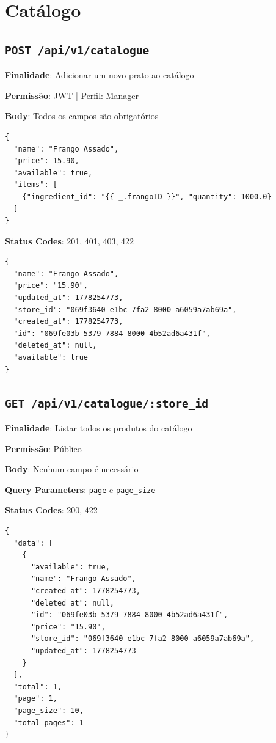 \section{Catálogo}

\subsection{\texttt{POST /api/v1/catalogue}}

\noindent\textbf{Finalidade}: Adicionar um novo prato ao catálogo

\noindent\textbf{Permissão}: JWT | Perfil: Manager

\noindent\textbf{Body}: Todos os campos são obrigatórios

\begin{verbatim}
{
  "name": "Frango Assado",
  "price": 15.90,
  "available": true,
  "items": [
    {"ingredient_id": "{{ _.frangoID }}", "quantity": 1000.0}
  ]
}
\end{verbatim}

\noindent\textbf{Status Codes}: 201, 401, 403, 422

\begin{tcolorbox}[colback=green!5, colframe=black, title=\textbf{201 Created}]
\begin{verbatim}
{
  "name": "Frango Assado",
  "price": "15.90",
  "updated_at": 1778254773,
  "store_id": "069f3640-e1bc-7fa2-8000-a6059a7ab69a",
  "created_at": 1778254773,
  "id": "069fe03b-5379-7884-8000-4b52ad6a431f",
  "deleted_at": null,
  "available": true
}
\end{verbatim}
\end{tcolorbox}

\subsection{\texttt{GET /api/v1/catalogue/:store\_id}}

\noindent\textbf{Finalidade}: Listar todos os produtos do catálogo

\noindent\textbf{Permissão}: Público

\noindent\textbf{Body}: Nenhum campo é necessário

\noindent\textbf{Query Parameters}: \texttt{page} e \texttt{page\_size}

\noindent\textbf{Status Codes}: 200, 422

\begin{tcolorbox}[colback=green!5, colframe=black, title=\textbf{200 OK}]
\begin{verbatim}
{
  "data": [
    {
      "available": true,
      "name": "Frango Assado",
      "created_at": 1778254773,
      "deleted_at": null,
      "id": "069fe03b-5379-7884-8000-4b52ad6a431f",
      "price": "15.90",
      "store_id": "069f3640-e1bc-7fa2-8000-a6059a7ab69a",
      "updated_at": 1778254773
    }
  ],
  "total": 1,
  "page": 1,
  "page_size": 10,
  "total_pages": 1
}
\end{verbatim}
\end{tcolorbox}

